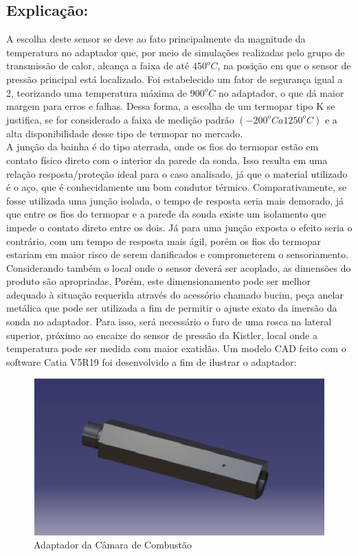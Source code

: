 \subsection{Explicação:}
	A escolha deste sensor se deve ao fato principalmente da magnitude da temperatura no adaptador que, por meio de simulações realizadas pelo grupo de transmissão de calor, alcança a faixa de até $450^o C$, na posição em que o sensor de pressão principal está localizado. Foi estabelecido um fator de segurança igual a 2, teorizando uma temperatura máxima de $900^{o}C$ no adaptador, o que dá maior margem para erros e falhas. Dessa forma, a escolha de um termopar tipo K se justifica, se for considerado a faixa de medição padrão $(-200^o C a 1250^o C)$ e a alta disponibilidade desse tipo de termopar no mercado.\\
	A junção da bainha é do tipo aterrada, onde os fios do termopar estão em contato físico direto com o interior da parede da sonda. Isso resulta em uma relação resposta/proteção ideal para o caso analisado, já que o material utilizado é o aço, que é conhecidamente um bom condutor térmico. Comparativamente, se fosse utilizada uma junção isolada, o tempo de resposta seria mais demorado, já que entre os fios do termopar e a parede da sonda existe um isolamento que impede o contato direto entre os dois. Já para uma junção exposta o efeito seria o contrário, com um tempo de resposta mais ágil, porém os fios do termopar estariam em maior risco de serem danificados e comprometerem o sensoriamento.\\
	Considerando também o local onde o sensor deverá ser acoplado, as dimensões do produto são apropriadas. Porém, este dimensionamento pode ser melhor adequado à situação requerida através do acessório chamado bucim, peça anelar metálica que pode ser utilizada a fim de permitir o ajuste exato da imersão da sonda no adaptador. Para isso, será necessário o furo de uma rosca na lateral superior, próximo ao encaixe do sensor de pressão da Kistler, local onde a temperatura pode ser medida com maior exatidão. Um modelo CAD feito com o software Catia V5R19 foi desenvolvido a fim de ilustrar o adaptador:
\begin{figure}[!htb]                   
		\centering                          
		\includegraphics[scale=1]{figuras/adaptador.eps}
		\caption{Adaptador da Câmara de Combustão}               
\end{figure}
